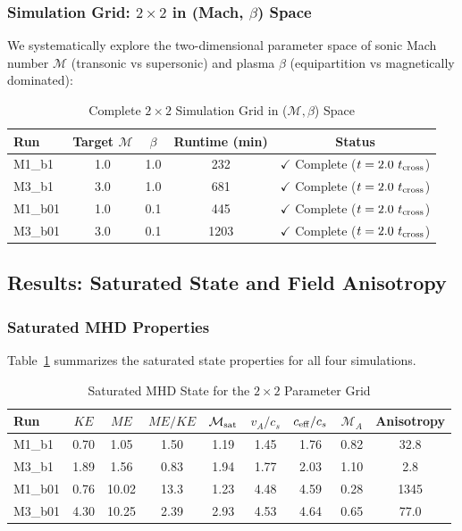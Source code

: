 \documentclass[11pt,a4paper]{article}
\begin{document}
\subsubsection{Simulation Grid: $2\times2$ in (Mach, $\beta$) Space}

We systematically explore the two-dimensional parameter space of sonic Mach number $\mathcal{M}$ (transonic vs supersonic) and plasma $\beta$ (equipartition vs magnetically dominated):

\begin{table}[H]
\centering
\caption{Complete $2\times2$ Simulation Grid in ($\mathcal{M}, \beta$) Space}
\begin{tabular}{lcccc}
\toprule
Run & Target $\mathcal{M}$ & $\beta$ & Runtime (min) & Status \\
\midrule
M1\_b1  & 1.0 & 1.0 & 232  & $\checkmark$ Complete ($t = 2.0~t_{\rm cross}$) \\
M3\_b1  & 3.0 & 1.0 & 681  & $\checkmark$ Complete ($t = 2.0~t_{\rm cross}$) \\
M1\_b01 & 1.0 & 0.1 & 445  & $\checkmark$ Complete ($t = 2.0~t_{\rm cross}$) \\
M3\_b01 & 3.0 & 0.1 & 1203 & $\checkmark$ Complete ($t = 2.0~t_{\rm cross}$) \\
\bottomrule
\end{tabular}
\end{table}

\subsection{Results: Saturated State and Field Anisotropy}

\subsubsection{Saturated MHD Properties}

Table~\ref{tab:mhd_saturated} summarizes the saturated state properties for all four simulations.

\begin{table}[H]
\centering
\caption{Saturated MHD State for the $2\times2$ Parameter Grid}
\label{tab:mhd_saturated}
\begin{tabular}{lcccccccc}
\toprule
Run & $KE$ & $ME$ & $ME/KE$ & $\mathcal{M}_{\rm sat}$ & $v_A/c_s$ & $c_{\rm eff}/c_s$ & $\mathcal{M}_A$ & Anisotropy \\
\midrule
M1\_b1  & 0.70 & 1.05 & 1.50 & 1.19 & 1.45 & 1.76 & 0.82 & 32.8 \\
M3\_b1  & 1.89 & 1.56 & 0.83 & 1.94 & 1.77 & 2.03 & 1.10 & 2.8 \\
M1\_b01 & 0.76 & 10.02 & 13.3 & 1.23 & 4.48 & 4.59 & 0.28 & 1345 \\
M3\_b01 & 4.30 & 10.25 & 2.39 & 2.93 & 4.53 & 4.64 & 0.65 & 77.0 \\
\bottomrule
\end{tabular}
\end{table}
\end{document}
